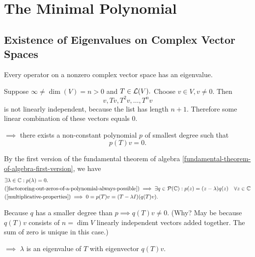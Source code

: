 \section{The Minimal Polynomial}
\subsection{Existence of Eigenvalues on Complex Vector Spaces}

\begin{thm} 
  \label{thm: existence of eigenvalues}
  Every operator on a \fd non\-zero complex vector space has an eigenvalue.
\end{thm}
\begin{prf}
  Suppose $\infty \neq \dim(V)=n>0$ and $T\in \mathcal{L}(V).$ Choose $v\in V, v\neq0$. Then
  \begin{equation}
    v, Tv, T^2v, \dots, T^nv
  \end{equation}
  is not linearly independent,
  because the list has length $n+1$. Therefore some linear combination of these vectors equals $0$.

  $\implies$ there exists a non-constant polynomial $p$ of smallest degree such that
  \begin{equation}
    p(T)v = 0.
  \end{equation}

  By the first version of the fundamental theorem of algebra \ref{fundamental-theorem-of-algebra-first-version}, we have
  \begin{equation}
    \begin{aligned}
      &\exists \lambda \in \mathbb{C}: p(\lambda) = 0. \\
      &\text{(\ref{factororing-out-zeros-of-a-polynomial-always-possible})}
      \implies \exists q \in \mathcal {P} (\mathbb{C}): p(z) = (z-\lambda)  q(z) \quad \forall z \in \mathbb{C} \\
      &\text{(\ref{multiplicative-properties})} \implies 0=p(T)v=(T-\lambda I) (q(T)v).
    \end{aligned}
  \end{equation}

  Because $q$ has a smaller degree than $p \implies q(T)v \neq 0$. (Why? May be because $q(T)v$ consists of $n=\dim V$ linearly independent vectors added together. The sum of zero is unique in this case.)

  $\implies$ $\lambda$ is an eigenvalue of $T$ with eigenvector $q(T)v$.
\end{prf}

